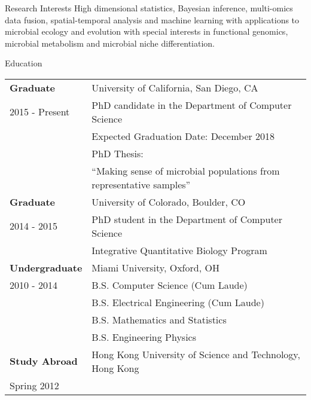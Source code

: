 \documentclass{resume} %
\begin{document}

\begin{rSection}{Research Interests}
  High dimensional statistics, Bayesian inference, multi-omics data fusion, spatial-temporal analysis and machine learning with applications to microbial ecology and evolution with special interests in functional genomics, microbial metabolism and microbial niche differentiation.
\end{rSection}
\begin{rSection}{Education}
  \begin{tabular}{ll}
    \textbf{Graduate}      & University of California, San Diego, CA  \\
    2015 - Present  & PhD candidate in the Department of Computer Science \\
                    & Expected Graduation Date: December 2018\\
                    & PhD Thesis: \\
                    & ``Making sense of microbial populations from representative samples''\\
    \textbf{Graduate}      & University of Colorado, Boulder, CO \\
    2014 - 2015   & PhD student in the Department of Computer Science \\
                  & Integrative Quantitative Biology Program \\
    \textbf{Undergraduate} & Miami University, Oxford, OH \\
    2010 - 2014   & B.S. Computer Science (Cum Laude)\\
    & B.S. Electrical Engineering (Cum Laude)\\
    & B.S. Mathematics and Statistics \\
    & B.S. Engineering Physics \\
    \textbf{Study Abroad} &  Hong Kong University of Science and Technology, Hong Kong   \\
    Spring 2012 \\
  \end{tabular}
\end{rSection}
\end{document}
